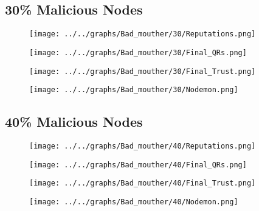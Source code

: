 \begin{minipage}[t]{0.49\columnwidth}
\subsection*{30\% Malicious Nodes}
    \begin{figure}[H]
        \centering
        \texttt{[image: ../../graphs/Bad\_mouther/30/Reputations.png]}
    \end{figure}
    \begin{figure}[H]
        \centering
        \texttt{[image: ../../graphs/Bad\_mouther/30/Final\_QRs.png]}
    \end{figure}
\end{minipage}
\begin{minipage}[t]{0.49\columnwidth}
    \begin{figure}[H]
        \centering
        \texttt{[image: ../../graphs/Bad\_mouther/30/Final\_Trust.png]}
    \end{figure}
    \begin{figure}[H]
        \centering
        \texttt{[image: ../../graphs/Bad\_mouther/30/Nodemon.png]}
    \end{figure}
\end{minipage}

\begin{minipage}[t]{0.49\columnwidth}
\subsection*{40\% Malicious Nodes}
    \begin{figure}[H]
        \centering
        \texttt{[image: ../../graphs/Bad\_mouther/40/Reputations.png]}
    \end{figure}
    \begin{figure}[H]
        \centering
        \texttt{[image: ../../graphs/Bad\_mouther/40/Final\_QRs.png]}
    \end{figure}
\end{minipage}
\begin{minipage}[t]{0.49\columnwidth}
    \begin{figure}[H]
        \centering
        \texttt{[image: ../../graphs/Bad\_mouther/40/Final\_Trust.png]}
    \end{figure}
    \begin{figure}[H]
        \centering
        \texttt{[image: ../../graphs/Bad\_mouther/40/Nodemon.png]}
    \end{figure}
\end{minipage}

